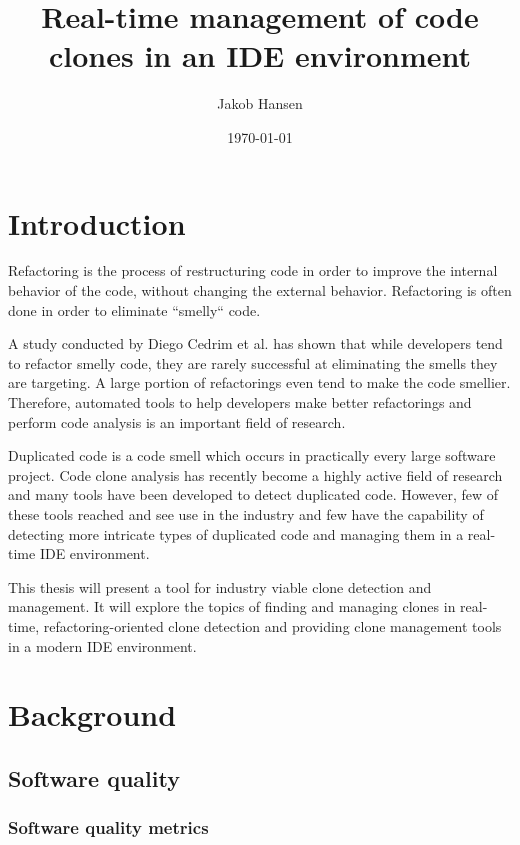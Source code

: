 \documentclass[12pt]{article}
\title{\vspace{-20px}Real-time management of code clones in an IDE environment}
\author{Jakob Hansen}
\date{\today}
\begin{document}
\maketitle

\tableofcontents

\section{Introduction}

Refactoring is the process of restructuring code in order to improve the internal behavior
of the code, without changing the external behavior\cite[9]{fowlerrefactoring}. Refactoring
is often done in order to eliminate ``smelly`` code.

A study conducted by Diego Cedrim et al.\cite{Rohit_Gheyi_Impact} has shown that while
developers tend to refactor smelly code, they are rarely successful at eliminating the
smells they are targeting. A large portion of refactorings even tend to make the code
smellier. Therefore, automated tools to help developers make better refactorings and
perform code analysis is an important field of research.

Duplicated code is a code smell which occurs in practically every large software project.
Code clone analysis has recently become a highly active field of research and many tools have
been developed to detect duplicated code\cite[7]{Inoue_introduction_to_cc}. However, few of
these tools reached and see use in the industry and few have the capability of detecting
more intricate types of duplicated code and managing them in a real-time IDE environment.

This thesis will present a tool for industry viable clone detection and management. It
will explore the topics of finding and managing clones in real-time, refactoring-oriented
clone detection and providing clone management tools in a modern IDE environment.

\section{Background}

\subsection{Software quality}

\subsubsection{Software quality metrics}
\end{document}
